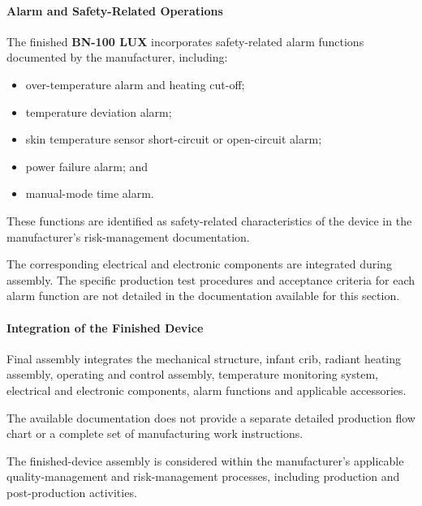 
\paragraph{Alarm and Safety-Related Operations}

The finished \textbf{BN-100 LUX} incorporates safety-related alarm
functions documented by the manufacturer, including:

\begin{itemize}
    \item over-temperature alarm and heating cut-off;
    \item temperature deviation alarm;
    \item skin temperature sensor short-circuit or open-circuit alarm;
    \item power failure alarm; and
    \item manual-mode time alarm.
\end{itemize}

These functions are identified as safety-related characteristics
of the device in the manufacturer's risk-management documentation.

The corresponding electrical and electronic components are
integrated during assembly. The specific production test procedures
and acceptance criteria for each alarm function are not detailed
in the documentation available for this section.


\paragraph{Integration of the Finished Device}

Final assembly integrates the mechanical structure, infant crib,
radiant heating assembly, operating and control assembly,
temperature monitoring system, electrical and electronic
components, alarm functions and applicable accessories.

The available documentation does not provide a separate detailed
production flow chart or a complete set of manufacturing work
instructions.

The finished-device assembly is considered within the
manufacturer's applicable quality-management and risk-management
processes, including production and post-production activities.

